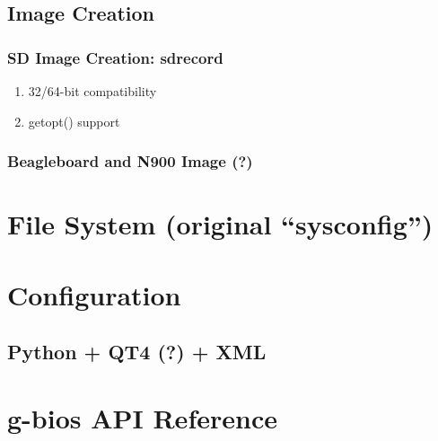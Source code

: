 \documentclass[a4paper,11pt]{book}
\begin{document}
\section{Image Creation}

\subsection{SD Image Creation: sdrecord}
\begin{enumerate}
\item 32/64-bit compatibility
\item getopt() support
\end{enumerate}

\subsection{Beagleboard and N900 Image (?)}

\chapter{File System (original ``sysconfig'')}

\chapter{Configuration}

\section{Python + QT4 (?) + XML}

\chapter{g-bios API Reference}

\end{document}
